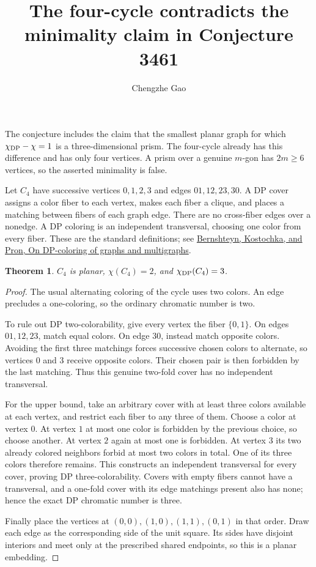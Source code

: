 \documentclass[11pt]{article}
\newtheorem{theorem}{Theorem}
\begin{document}
\title{The four-cycle contradicts the minimality claim in Conjecture 3461}
\author{Chengzhe Gao}\date{}\maketitle

The conjecture includes the claim that the smallest planar graph for which
$\chi_{\rm DP}-\chi=1$ is a three-dimensional prism. The four-cycle already
has this difference and has only four vertices. A prism over a genuine
$m$-gon has $2m\geq6$ vertices, so the asserted minimality is false.

Let $C_4$ have successive vertices $0,1,2,3$ and edges $01,12,23,30$.
A DP cover assigns a color fiber to each vertex, makes each fiber a clique,
and places a matching between fibers of each graph edge. There are no
cross-fiber edges over a nonedge. A DP coloring is an independent transversal,
choosing one color from every fiber. These are the standard definitions;
see \href{https://arxiv.org/abs/1609.00763}{Bernshteyn, Kostochka, and Pron,
On DP-coloring of graphs and multigraphs}.

\begin{theorem}
$C_4$ is planar, $\chi(C_4)=2$, and $\chi_{\rm DP}(C_4)=3$.
\end{theorem}
\begin{proof}
The usual alternating coloring of the cycle uses two colors. An edge
precludes a one-coloring, so the ordinary chromatic number is two.

To rule out DP two-colorability, give every vertex the fiber $\{0,1\}$.
On edges $01,12,23$, match equal colors. On edge $30$, instead match
opposite colors. Avoiding the first three matchings forces successive
chosen colors to alternate, so vertices $0$ and $3$ receive opposite
colors. Their chosen pair is then forbidden by the last matching. Thus
this genuine two-fold cover has no independent transversal.

For the upper bound, take an arbitrary cover with at least three colors
available at each vertex, and restrict each fiber to any three of them.
Choose a color at vertex $0$. At vertex $1$ at most one color is forbidden
by the previous choice, so choose another. At vertex $2$ again at most
one is forbidden. At vertex $3$ its two already colored neighbors forbid
at most two colors in total. One of its three colors therefore remains.
This constructs an independent transversal for every cover, proving
DP three-colorability. Covers with empty fibers cannot have a transversal,
and a one-fold cover with its edge matchings present also has none; hence
the exact DP chromatic number is three.

Finally place the vertices at $(0,0),(1,0),(1,1),(0,1)$ in that order.
Draw each edge as the corresponding side of the unit square. Its sides
have disjoint interiors and meet only at the prescribed shared endpoints,
so this is a planar embedding.
\end{proof}
\end{document}
